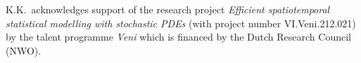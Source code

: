 \documentclass[reqno]{amsart}
\numberwithin{equation}{section}
\theoremstyle{remark}
\theoremstyle{definition}
\begin{document}
K.K.\ acknowledges support 
of the research project 
\emph{Efficient spatiotemporal statistical modelling 
	with stochastic PDEs} 
(with project number  
VI.Veni.212.021) 
by the talent programme \emph{Veni}  
which is financed by 
the Dutch Research Council (NWO). 




\vspace{-0.15\baselineskip}
\end{document}
